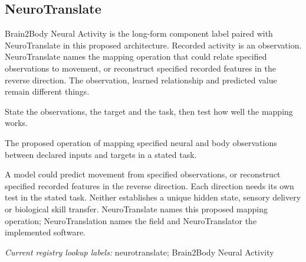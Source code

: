 \begin{samepage}
\subsection*{NeuroTranslate}
\noindent Brain2Body Neural Activity is the long-form component label paired with NeuroTranslate in this proposed architecture. Recorded activity is an observation. NeuroTranslate names the mapping operation that could relate specified observations to movement, or reconstruct specified recorded features in the reverse direction. The observation, learned relationship and predicted value remain different things.\par
\noindent State the observations, the target and the task, then test how well the mapping works.\par
\end{samepage}
\noindent The proposed operation of mapping specified neural and body observations between declared inputs and targets in a stated task.\par
\begin{samepage}
\noindent A model could predict movement from specified observations, or reconstruct specified recorded features in the reverse direction. Each direction needs its own test in the stated task. Neither establishes a unique hidden state, sensory delivery or biological skill transfer. NeuroTranslate names this proposed mapping operation; NeuroTranslation names the field and NeuroTranslator the implemented software.\par\nopagebreak[4]

\end{samepage}


\noindent\textit{Current registry lookup labels:} neurotranslate; Brain2Body Neural Activity\par

